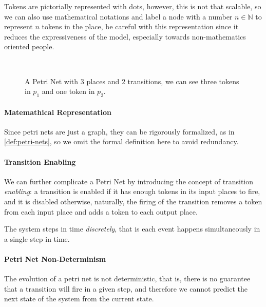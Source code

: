 \documentclass[openright, twoside, twocolumn]{report}
\newcommand{\incsvg}[2]{%
	\def\svgwidth{\columnwidth}
	\graphicspath{{#1}}
	
}
\begin{document}
    Tokens are pictorially represented with dots, however, this is not that scalable, so we can also use mathematical
    notations and label a node with a number $n \in \mathbb{N}$ to represent $n$ tokens in the place, be careful with
    this representation since it reduces the expressiveness of the model, especially towards non-mathematics oriented
    people.


    \begin{figure}[ht]
      \centering
      \incsvg{fig}{fig/pnet}\\
      \label{fig:pnet}
      \caption{%
        A Petri Net with 3 places and 2 transitions, we can
        see three tokens in $p_1$ and one token in $p_2$.
      }
    \end{figure}

    \paragraph{Matemathical Representation}
    Since petri nets are just a graph, they can be rigorously formalized, as in \cref{def:petri-nets}, so we omit
    the formal definition here to avoid redundancy.

    \paragraph{Transition Enabling}

    We can further complicate a Petri Net by introducing the concept of transition \emph{enabling}: a transition
    is enabled if it has enough tokens in its input places to fire, and it is disabled otherwise, naturally,
    the firing of the transition removes a token from each input place and adds a token to each output place.

    The system steps in time \emph{discretely}, that is each event happens simultaneously in a single step in
    time.

    \paragraph{Petri Net Non-Determinism}

    The evolution of a petri net is not deterministic, that is, there is no guarantee that a transition will fire
    in a given step, and therefore we cannot predict the next state of the system from the current state.
\end{document}
